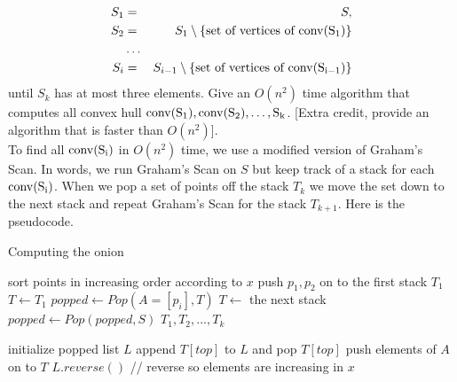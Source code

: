 \documentclass[11pt]{article}
\newcommand{\conv}[1]{\rm{conv}(#1)}
\begin{document}
\begin{eqnarray*}
	S_1 &=& S, \\
	S_2 &=& S_1 \setminus \{ \text{set of vertices of } \conv{S_1} \} \\
		&\ldots& \\
	S_i &=& S_{i-1} \setminus \{ \text{set of vertices of } \conv{S_{i-1}} \}
\end{eqnarray*}
%
until $S_k$ has at most three elements.  Give an $O(n^2)$ time algorithm that
computes all convex hull $\conv{S_1}, \conv{S_2}, \ldots, S_k$.  [Extra credit,
provide an algorithm that is faster than $O(n^2)$]. \\


\answer
To find all $\conv{S_i}$ in $O(n^2)$ time, we use a modified version of Graham's Scan.
In words, we run Graham's Scan on $S$ but keep track of a stack for each $\conv{S_i}$.
When we pop a set of points off the stack $T_k$ we move the set down to the next stack and repeat Graham's Scan for the stack $T_{k+1}$.
Here is the pseudocode.

\begin{algorithm}
\caption{Computing the onion}
    \label{alg:onion}
    \begin{algorithmic}[1]
        \State sort points in increasing order according to $x$
        \State push $p_1, p_2$ on to the first stack $T_1$
            \State $T \gets T_1$
            \State $popped \gets Pop(A=[p_i], T)$
                \State $T \gets$ the next stack
                \State $popped \gets Pop(popped, S)$
            \EndWhile
        \EndFor
        \State \Return $T_1, T_2, ..., T_k$
    \EndFunction
    \end{algorithmic}

    \begin{algorithmic}[1]
        \State initialize popped list $L$
            \State append $T[top]$ to $L$ and pop $T[top]$
        \EndWhile
        \State push elements of $A$ on to $T$
        \State \Return $L.reverse()$ // reverse so elements are increasing in $x$
    \EndFunction
    \end{algorithmic}
\end{algorithm}
\end{document}
